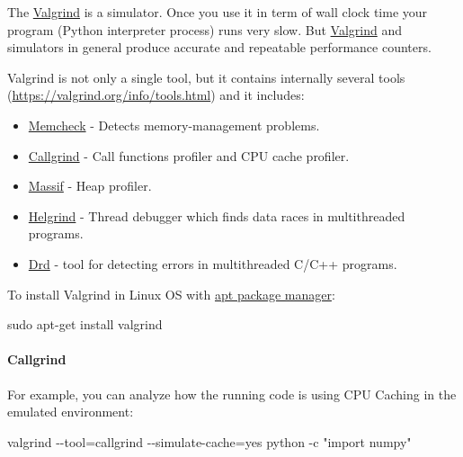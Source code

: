 \documentclass[
]{article}
\newenvironment{Shaded}{}{}
\newcommand{\AttributeTok}[1]{\textcolor[rgb]{0.49,0.56,0.16}{#1}}
\newcommand{\FunctionTok}[1]{\textcolor[rgb]{0.02,0.16,0.49}{#1}}
\newcommand{\NormalTok}[1]{#1}
\newcommand{\OperatorTok}[1]{\textcolor[rgb]{0.40,0.40,0.40}{#1}}
\newcommand{\StringTok}[1]{\textcolor[rgb]{0.25,0.44,0.63}{#1}}
\begin{document}
The \href{https://valgrind.org/}{Valgrind} is a simulator. Once you use
it in term of wall clock time your program (Python interpreter process)
runs very slow. But \href{https://valgrind.org/}{Valgrind} and
simulators in general produce accurate and repeatable performance
counters.

Valgrind is not only a single tool, but it contains internally several
tools (\url{https://valgrind.org/info/tools.html}) and it includes:

\begin{itemize}
\item
  \href{https://valgrind.org/docs/manual/mc-manual.html}{Memcheck} -
  Detects memory-management problems.
\item
  \href{https://valgrind.org/docs/manual/cl-manual.html}{Callgrind} -
  Call functions profiler and CPU cache profiler.
\item
  \href{https://valgrind.org/docs/manual/ms-manual.html}{Massif} - Heap
  profiler.
\item
  \href{https://valgrind.org/docs/manual/hg-manual.html}{Helgrind} -
  Thread debugger which finds data races in multithreaded programs.
\item
  \href{https://valgrind.org/docs/manual/drd-manual.html\#drd-manual.using-drd\%0A}{Drd}
  - tool for detecting errors in multithreaded C/C++ programs.
\end{itemize}

To install Valgrind in Linux OS with
\href{https://help.ubuntu.com/community/AptGet/Howto}{apt package
manager}:

\begin{Shaded}
\begin{Highlighting}[]
\FunctionTok{sudo}\NormalTok{  apt{-}get install valgrind}
\end{Highlighting}
\end{Shaded}

\hypertarget{callgrind}{%
\paragraph{Callgrind}\label{callgrind}}

For example, you can analyze how the running code is using CPU Caching
in the emulated environment:

\begin{Shaded}
\begin{Highlighting}[]
\FunctionTok{valgrind} \AttributeTok{{-}{-}tool}\OperatorTok{=}\NormalTok{callgrind }\AttributeTok{{-}{-}simulate{-}cache}\OperatorTok{=}\NormalTok{yes python }\AttributeTok{{-}c} \StringTok{"import numpy"}
\end{Highlighting}
\end{Shaded}
\end{document}
